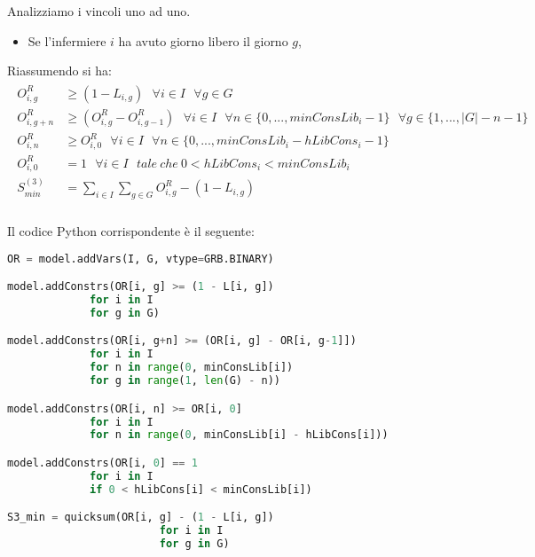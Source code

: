 Analizziamo i vincoli uno ad uno.
\begin{itemize}
\item Se l'infermiere $i$ ha avuto giorno libero il giorno $g$, 
\end{itemize}

















Riassumendo si ha:
\begin{gather}
\begin{aligned}
O_{i,g}^R &\geq (1 - L_{i,g}) ~~~ \forall i \in I ~~~ \forall g \in G \\
O_{i,g+n}^R &\geq (O_{i,g}^R - O_{i,g-1}^R) ~~~ \forall i \in I ~~~ \forall n \in \{0,...,minConsLib_i - 1\} ~~~ \forall g \in \{1,...,|G| - n - 1\} \\
O_{i,n}^R &\geq O_{i,0}^R ~~~ \forall i \in I ~~~ \forall n \in \{0,...,minConsLib_i - hLibCons_i - 1\} \\
O_{i,0}^R &= 1 ~~~ \forall i \in I ~~~ tale ~ che ~ 0 < hLibCons_i < minConsLib_i \\
S^{(3)}_{min} &= \sum_{i \in I} \sum_{g \in G} O_{i,g}^R - (1 - L_{i,g}) \\
\end{aligned}
\end{gather}

Il codice Python corrispondente è il seguente:
\begin{lstlisting}[language=Python]
OR = model.addVars(I, G, vtype=GRB.BINARY)

model.addConstrs(OR[i, g] >= (1 - L[i, g])
             for i in I
             for g in G)

model.addConstrs(OR[i, g+n] >= (OR[i, g] - OR[i, g-1]])
             for i in I
             for n in range(0, minConsLib[i])
             for g in range(1, len(G) - n))

model.addConstrs(OR[i, n] >= OR[i, 0]
             for i in I
             for n in range(0, minConsLib[i] - hLibCons[i]))

model.addConstrs(OR[i, 0] == 1
             for i in I
             if 0 < hLibCons[i] < minConsLib[i])

S3_min = quicksum(OR[i, g] - (1 - L[i, g])
                        for i in I
                        for g in G)
\end{lstlisting}


